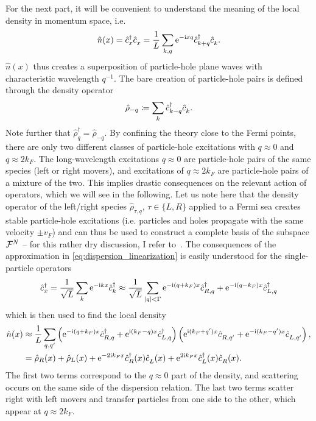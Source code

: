 For the next part, it will be convenient to understand the meaning of the local density in momentum space, i.e.
\begin{align}
    \hat n(x) = \hat c^\dag_x \hat c^\pdag_x = \frac1L\sum_{k,q}\re^{-\ri x q}\hat c^\dag_{k+q}\hat c^\pdag_{k}.
    \label{eq:local_density}
\end{align}
$\hat n(x)$ thus creates a superposition of particle-hole plane waves with characteristic wavelength $q^{-1}$.
The bare creation of particle-hole pairs is defined through the density operator
\begin{align}
    \hat \rho_{-q}\coloneqq \sum_k \hat c^\dag_{k-q}\hat c^\pdag_{k}.
\end{align}
Note further that $\hat\rho_q^\dag = \hat\rho_{-q}$.
By confining the theory close to the Fermi points, there are only two different classes of particle-hole excitations with $q\approx 0$ and $q\approx2k_F$.
The long-wavelength excitations $q\approx0$ are particle-hole pairs of the same species (left or right movers), and excitations of $q\approx2k_F$ are particle-hole pairs of a mixture of the two.
This implies drastic consequences on the relevant action of operators, which we will see in the following.
Let us note here that the density operator of the left/right species $\hat\rho_{\tau,q}$, $\tau\in\{L,R\}$ applied to a Fermi sea creates stable particle-hole excitations (i.e. particles and holes propagate with the same velocity $\pm v_F$) and can thus be used to construct a complete basis of the subspace $\mathcal{F}^N$ -- for this rather dry discussion, I refer to~\cite{vonDelft1998}.
The consequences of the approximation in \cref{eq:dispersion_linearization} is easily understood for the single-particle operators
\begin{align}
    \hat c^\dag_x = \frac1{\sqrt L}\sum_k \mathrm e^{-\mathrm i k x}\hat c^\dag_k \approx \frac1{\sqrt L}\sum_{|q|<\Gamma}\mathrm e^{-\mathrm i (q+k_F) x}\hat c^\dag_{R, q} + \mathrm e^{-\mathrm i (q-k_F) x}\hat c^\dag_{L, q}
    \label{eq:confinement_creation_annihilation}
\end{align}
which is then used to find the local density
\begin{align}
    \hat n(x)
    &\approx \frac1L\sum_{q,q'}\brlr{\re^{-\ri (q+k_F) x}\hat c^\dag_{R, q} + \re^{\ri (k_F-q) x}\hat c^\dag_{L, q}}\brlr{\re^{\ri (k_F+q') x}\hat c^\pdag_{R, q'} + \re^{-\ri (k_F-q') x}\hat c^\pdag_{L, q'}},
    \\
    &= \hat \rho_R(x) + \hat \rho_L(x) + \re^{-2\ri k_Fx}\hat c^\dag_{R}(x)\hat c^\pdag_{L}(x) + \re^{2\ri k_Fx}\hat c^\dag_{L}(x)\hat c^\pdag_{R}(x).
    \label{eq:local_density_approximation}
\end{align}
The first two terms correspond to the $q\approx0$ part of the density, and scattering occurs on the same side of the dispersion relation.
The last two terms scatter right with left movers and transfer particles from one side to the other, which appear at $q\approx2k_F$.

